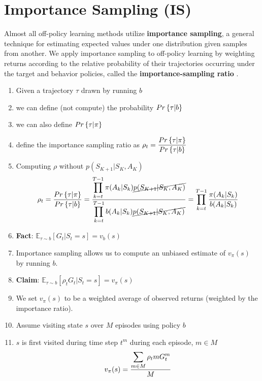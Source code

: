 \section{Importance Sampling (IS) \cite{medium/nerd-for-tech/monte-carlo-methods-for-reinforcement-learning-d30d874dd817,bits-pilani-slides}}\label{Importance Sampling (IS)}

Almost all off-policy learning methods utilize \textbf{importance sampling}, a general technique for estimating expected values under one distribution given samples from another. We apply importance sampling to off-policy learning by weighting returns according to the relative probability of their trajectories occurring under the target and behavior policies, called the \textbf{importance-sampling ratio} .

\begin{enumerate}
    \item Given a trajectory $\tau$ drawn by running $b$
    \item we can define (not compute) the probability $Pr\left\{\tau|b\right\}$
    \item we can also define $Pr\left\{\tau|\pi\right\}$
    \item define the importance sampling ratio as $\rho_t = \displaystyle\dfrac{Pr\left\{\tau|\pi\right\}}{Pr\left\{\tau|b\right\}}$
    \item Computing $\rho$ without $p(S_{K+1}|S_K,A_K)$ 
    \[
        \rho_t = \displaystyle\dfrac{Pr\left\{\tau|\pi\right\}}{Pr\left\{\tau|b\right\}} = \displaystyle\dfrac{\displaystyle\prod_{k=t}^{T-1} \pi(A_k|S_k)\cancel{p(S_{K+1}|S_K,A_K)}}{\displaystyle\prod_{k=t}^{T-1} b(A_k|S_k)\cancel{p(S_{K+1}|S_K,A_K)}} = \displaystyle\prod_{k=t}^{T-1}\displaystyle\dfrac{\pi(A_k|S_k)}{b(A_k|S_k)}
    \]
    \item \textbf{Fact}: \( \mathbb{E}_{\tau \sim b}[G_t|S_t=s]=v_b(s) \)
    \item Importance sampling allows us to compute an unbiased estimate of $v_\pi(s)$ by running $b$.
    \item \textbf{Claim}: \( \mathbb{E}_{\tau \sim b}[\rho_t G_t|S_t=s]=v_\pi(s) \)
    \item We set $v_\pi(s)$ to be a weighted average of observed returns (weighted by the importance ratio).
    \item Assume visiting state $s$ over $M$ episodes using policy $b$
    \item $s$ is first visited during time step $t^m$ during each episode, $m\in M$
    \[
        v_\pi(s) = \displaystyle\dfrac{\displaystyle\sum_{m\in M} \rho_t m G_t^m}{M}
    \]
\end{enumerate}


